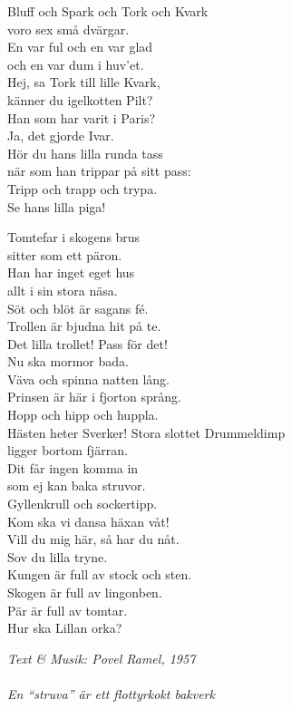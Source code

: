 \vspace{10pt}
Bluff och Spark och Tork och Kvark\\
voro sex små dvärgar.\\
En var ful och en var glad \\
och en var dum i huv'et.\\
Hej, sa Tork till lille Kvark,\\
känner du igelkotten Pilt?\\
Han som har varit i Paris?\\
Ja, det gjorde Ivar.\\
Hör du hans lilla runda tass\\
när som han trippar på sitt pass:\\
Tripp och trapp och trypa.\\
Se hans lilla piga!\par
\vspace{10pt}
Tomtefar i skogens brus\\
sitter som ett päron.\\
Han har inget eget hus \\
allt i sin stora näsa.\\
Söt och blöt är sagans fé.\\
Trollen är bjudna hit på te.\\
Det lilla trollet! Pass för det!\\
Nu ska mormor bada.\\
Väva och spinna natten lång.\\
Prinsen är här i fjorton språng.\\
Hopp och hipp och huppla.\\
Hästen heter Sverker!
\newpage
Stora slottet Drummeldimp\\
ligger bortom fjärran.\\
Dit får ingen komma in\\
som ej kan baka struvor.\\
Gyllenkrull och sockertipp.\\
Kom ska vi dansa häxan våt!\\
Vill du mig här, så har du nåt.\\
Sov du lilla tryne.\\
Kungen är full av stock och sten.\\
Skogen är full av lingonben.\\
Pär är full av tomtar.\\
Hur ska Lillan orka?\par
\vspace{10pt}
{\footnotesize\textit{Text \& Musik: Povel Ramel, 1957\\ \\ En
    ``struva'' är ett flottyrkokt bakverk}}
